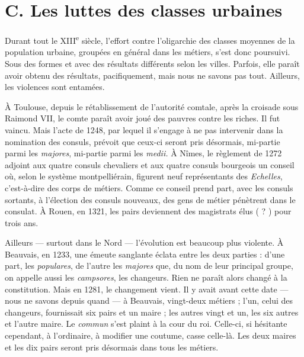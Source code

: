 \documentclass[french,twoside]{book} %
\begin{document}
\section[C. Les luttes des classes urbaines]{C. Les luttes des classes urbaines}
\label{c08c}
\noindent Durant tout le XIII\textsuperscript{e} siècle, l’effort contre l’oligarchie des classes moyennes de la population urbaine, groupées en général dans les métiers, s’est donc poursuivi. Sous des formes et avec des résultats différents selon les villes. Parfois, elle paraît avoir obtenu des résultats, pacifiquement, mais nous ne savons pas tout. Ailleurs, les violences sont entamées.\par
À Toulouse, depuis le rétablissement de l’autorité comtale, après la croisade sous Raimond VII, le comte paraît avoir joué des pauvres contre les riches. Il fut vaincu. Mais l’acte de 1248, par lequel il s’engage à ne pas intervenir dans la nomination des consuls, prévoit que ceux-ci seront pris désormais, mi-partie parmi les {\itshape majores}, mi-partie parmi les {\itshape medii.} À Nîmes, le règlement de 1272 adjoint aux quatre consuls chevaliers et aux quatre consuls bourgeois un conseil où, selon le système montpelliérain, figurent neuf représentants des \emph{Echelles}, c’est-à-dire des corps de métiers. Comme ce conseil prend part, avec les consuls sortants, à l’élection des consuls nouveaux, des gens de métier pénètrent dans le consulat. À Rouen, en 1321, les pairs deviennent des magistrats élus ( ? ) pour trois ans.\par
\label{p78} Ailleurs — surtout dans le Nord — l’évolution est beaucoup plus violente. À Beauvais, en 1233, une émeute sanglante éclata entre les deux parties : d’une part, les {\itshape populares}, de l’autre les {\itshape majores} que, du nom de leur principal groupe, on appelle aussi les {\itshape campsores}, les changeurs. Rien ne paraît alors changé à la constitution. Mais en 1281, le changement vient. Il y avait avant cette date — nous ne savons depuis quand — à Beauvais, vingt-deux métiers ; l’un, celui des changeurs, fournissait six pairs et un maire ; les autres vingt et un, les six autres et l’autre maire. Le \emph{commun} s’est plaint à la cour du roi. Celle-ci, si hésitante cependant, à l’ordinaire, à modifier une coutume, casse celle-là. Les deux maires et les dix pairs seront pris désormais dans tous les métiers.\par
\end{document}
